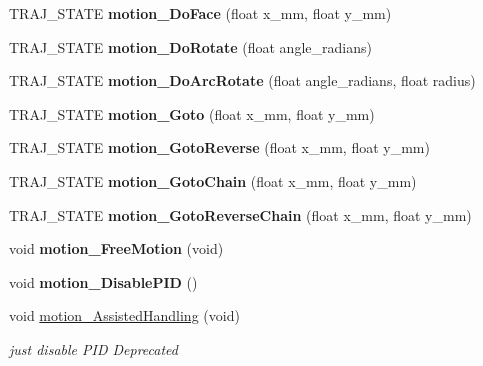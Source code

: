 \begin{DoxyCompactItemize}
T\+R\+A\+J\+\_\+\+S\+T\+A\+TE {\bfseries motion\+\_\+\+Do\+Face} (float x\+\_\+mm, float y\+\_\+mm)
\item 
\mbox{\label{classAsservDriver_aca1011c3fb10e594e836ea4ada6b92ff}} 
T\+R\+A\+J\+\_\+\+S\+T\+A\+TE {\bfseries motion\+\_\+\+Do\+Rotate} (float angle\+\_\+radians)
\item 
\mbox{\label{classAsservDriver_aabc36af66a38e2fb735e764730328994}} 
T\+R\+A\+J\+\_\+\+S\+T\+A\+TE {\bfseries motion\+\_\+\+Do\+Arc\+Rotate} (float angle\+\_\+radians, float radius)
\item 
\mbox{\label{classAsservDriver_a69d5e40538845c81b490a1ac3444847f}} 
T\+R\+A\+J\+\_\+\+S\+T\+A\+TE {\bfseries motion\+\_\+\+Goto} (float x\+\_\+mm, float y\+\_\+mm)
\item 
\mbox{\label{classAsservDriver_a96a9ab08074048b626f5f812c82c7342}} 
T\+R\+A\+J\+\_\+\+S\+T\+A\+TE {\bfseries motion\+\_\+\+Goto\+Reverse} (float x\+\_\+mm, float y\+\_\+mm)
\item 
\mbox{\label{classAsservDriver_a990f4ca32eef38a88031daa07fbe4546}} 
T\+R\+A\+J\+\_\+\+S\+T\+A\+TE {\bfseries motion\+\_\+\+Goto\+Chain} (float x\+\_\+mm, float y\+\_\+mm)
\item 
\mbox{\label{classAsservDriver_a724a7b68fdf74793ee2d159f82fe50e5}} 
T\+R\+A\+J\+\_\+\+S\+T\+A\+TE {\bfseries motion\+\_\+\+Goto\+Reverse\+Chain} (float x\+\_\+mm, float y\+\_\+mm)
\item 
\mbox{\label{classAsservDriver_ac9f37c4408c0a72913bd57f7f6ffa576}} 
void {\bfseries motion\+\_\+\+Free\+Motion} (void)
\item 
\mbox{\label{classAsservDriver_a0a68a702d1fea277c2e24e6dceb2d646}} 
void {\bfseries motion\+\_\+\+Disable\+P\+ID} ()
\item 
\mbox{\label{classAsservDriver_a11586683bd733079461ba5edcdcc7e89}} 
void \hyperlink{classAsservDriver_a11586683bd733079461ba5edcdcc7e89}{motion\+\_\+\+Assisted\+Handling} (void)
\begin{DoxyCompactList}\small\item\em just disable P\+ID Deprecated \end{DoxyCompactList}\item 

\end{DoxyCompactItemize}
